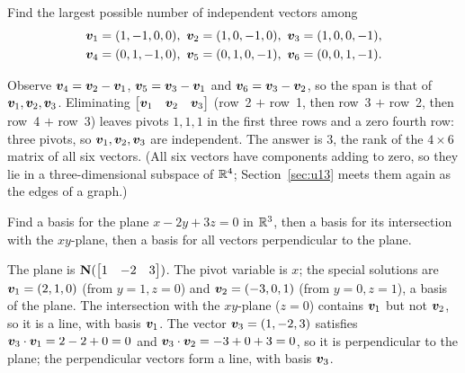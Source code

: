 \begin{exercise}\label{exr:u10-six}
Find the largest possible number of independent vectors among
\begin{gather*}
\boldsymbol{v}_1=(1,-1,0,0),\ \boldsymbol{v}_2=(1,0,-1,0),\ \boldsymbol{v}_3=(1,0,0,-1),\\
\boldsymbol{v}_4=(0,1,-1,0),\ \boldsymbol{v}_5=(0,1,0,-1),\ \boldsymbol{v}_6=(0,0,1,-1).
\end{gather*}
\end{exercise}
\begin{solution}
Observe $\boldsymbol{v}_4=\boldsymbol{v}_2-\boldsymbol{v}_1$, $\boldsymbol{v}_5=\boldsymbol{v}_3-\boldsymbol{v}_1$ and $\boldsymbol{v}_6=\boldsymbol{v}_3-\boldsymbol{v}_2$,
so the span is that of $\boldsymbol{v}_1,\boldsymbol{v}_2,\boldsymbol{v}_3$. Eliminating
$\begin{bmatrix}\boldsymbol{v}_1&\boldsymbol{v}_2&\boldsymbol{v}_3\end{bmatrix}$ (row~2 $+$ row~1, then row~3 $+$ row~2,
then row~4 $+$ row~3) leaves pivots $1,1,1$ in the first three rows and a zero fourth row: three
pivots, so $\boldsymbol{v}_1,\boldsymbol{v}_2,\boldsymbol{v}_3$ are independent. The answer is $3$, the rank of the
$4\times6$ matrix of all six vectors. (All six vectors have components adding to zero, so they lie
in a three-dimensional subspace of $\mathbb{R}^4$; Section~\ref{sec:u13} meets them again as the edges of a
graph.)
\end{solution}

\begin{exercise}\label{exr:u10-plane}
Find a basis for the plane $x-2y+3z=0$ in $\mathbb{R}^3$, then a basis for its intersection with the
$xy$-plane, then a basis for all vectors perpendicular to the plane.
\end{exercise}
\begin{solution}
The plane is $\mathbf{N}(\begin{bmatrix}1&-2&3\end{bmatrix})$. The pivot variable is $x$; the special
solutions are $\boldsymbol{v}_1=(2,1,0)$ (from $y=1,z=0$) and $\boldsymbol{v}_2=(-3,0,1)$ (from $y=0,z=1$), a basis
of the plane. The intersection with the $xy$-plane ($z=0$) contains $\boldsymbol{v}_1$ but not $\boldsymbol{v}_2$,
so it is a line, with basis $\boldsymbol{v}_1$. The vector $\boldsymbol{v}_3=(1,-2,3)$ satisfies
$\boldsymbol{v}_3\cdot\boldsymbol{v}_1=2-2+0=0$ and $\boldsymbol{v}_3\cdot\boldsymbol{v}_2=-3+0+3=0$, so it is perpendicular to the
plane; the perpendicular vectors form a line, with basis $\boldsymbol{v}_3$.
\end{solution}

